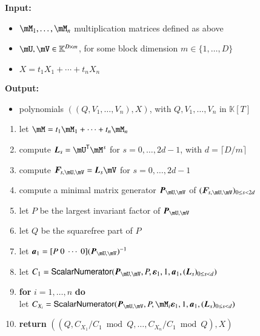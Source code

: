 \documentclass[final,1p,times,authoryear]{elsarticle}
\newcommand{\mat}[1]{\bm{\MakeUppercase{#1}}} %
\newcommand{\row}[1]{\bm{\MakeLowercase{#1}}} %
\newcommand{\col}[1]{\bm{\MakeLowercase{#1}}} %
\newcommand{\seqelt}[1]{\bm{F}_{#1}} %
\newcommand{\minpoly}{P}
\newcommand{\mainalgoname}{\mathsf{ BlockParametrization}}
\newcommand{\lf}{X}
\newcommand{\sqfree}{Q}
\newcommand{\trsp}[1]{#1^{\mathsf{T}}} %
\def\K{\mathbb{K}}
\def\K {\ensuremath{\mathbb{K}}}
\newcommand{\mUt}{\trsp{\mU}}
\begin{document}
\begin{algorithm}[ht]
  \caption{$\mainalgoname(\mM_1,\dots,\mM_n,\mU,\mV,\lf)$}
  {\bf Input:} \vspace{-0.5em}
  \begin{itemize}
    \item $\mM_1,\dots,\mM_n$ multiplication matrices defined as above
    \item  $\mU,\mV \in \mathbb{K}^{D \times m}$, for some block dimension  $m \in \{1,\dots,D\}$
    \item $\lf =t_1 X_1 + \cdots + t_n X_n$
  \end{itemize}
  {\bf Output:}  \vspace{-0.5em}
  \begin{itemize}
    \item         polynomials $((\sqfree,V_1,\dots,V_n),\lf)$, with $\sqfree,V_1,\dots,V_n$ in $\K[T]$
  \end{itemize}
  \begin{enumerate}
    \item\label{mainstep1}   let $\mM = t_1 \mM_1 + \cdots + t_n \mM_n$
    \item\label{mainstep3} { compute $\mat{L}_s = \mUt\mM^s$ for $s=0,\dots,2d-1$, with $d = \lceil D/m \rceil$}
    \item\label{mainstep4} { compute $\seqelt{s,\mU,\mV}= \mat{L}_s\mV$ for $s=0,\dots, 2d-1$}
    \item\label{mainstep5} { compute a minimal matrix generator $\mat{P}_{\mU,\mV}$ of $(\seqelt{s,\mU,\mV})_{0 \le s < 2d}$}
    \item\label{mainstep6} { let $\minpoly$ be the largest invariant factor of $\mat{P}_{\mU,\mV}$}
    \item\label{mainstep7} { let $\sqfree$ be  the squarefree part  of $\minpoly$}
    \item\label{mainstep8} { let $\row{a}_1 = [P~0 ~\cdots~ 0] (\mat{P}_{\mU,\mV})^{-1}$}
    \item\label{mainstep9}  let $C_1 = \mathsf{{\sf ScalarNumerator}}(\mat{P}_{\mU,\mV}, \minpoly, \col{\varepsilon}_1, 1, \row{a}_1, 
      (\mat{L}_s)_{0 \le s < d})$
    \item\label{mainstep10} \textbf{for} $i=1,\dots,n$ \textbf{do} \\
      \phantom{for}  let $C_{X_i} = \mathsf{{\sf ScalarNumerator}}(\mat{P}_{\mU,\mV}, \minpoly, \mM_i\col{\varepsilon}_1, 1, \row{a}_1, (\mat{L}_s)_{0 \le s < d})$
    \item\label{mainstep11}     \textbf{return} $((\sqfree, C_{X_1}/ C_1 \bmod \sqfree, \dots, C_{X_n}/ C_{1} \bmod \sqfree),\lf)$
  \end{enumerate}  \label{algo:block-sparse-fglm}
\end{algorithm}
\end{document}
